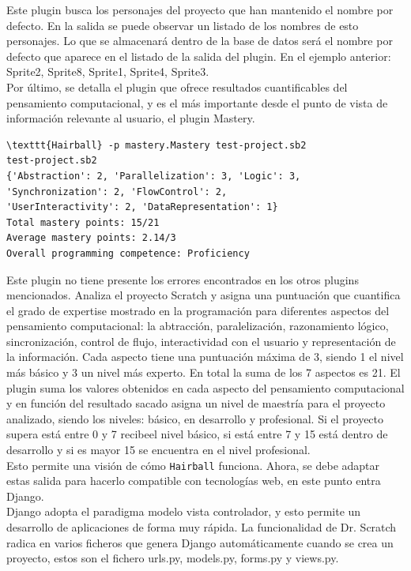 \documentclass[a4paper, 12pt]{book}
\begin{document}
Este plugin busca los personajes del proyecto que han mantenido el nombre por defecto. En
la salida se puede observar un listado de los nombres de esto personajes. Lo que se 
almacenará dentro de la base de datos será el nombre por defecto que aparece en el listado
de la salida del plugin. En el ejemplo anterior: Sprite2, Sprite8, Sprite1, Sprite4, Sprite3. \\


Por último, se detalla el plugin que ofrece resultados cuantificables del pensamiento 
computacional, y es el más importante desde el punto de vista de información relevante
al usuario, el plugin Mastery.

\begingroup
\fontsize{7pt}{8pt}\selectfont
\begin{verbatim}
\texttt{Hairball} -p mastery.Mastery test-project.sb2 
test-project.sb2
{'Abstraction': 2, 'Parallelization': 3, 'Logic': 3, 'Synchronization': 2, 'FlowControl': 2,
'UserInteractivity': 2, 'DataRepresentation': 1}
Total mastery points: 15/21
Average mastery points: 2.14/3
Overall programming competence: Proficiency
\end{verbatim}
\endgroup

Este plugin no tiene presente los errores encontrados en los otros plugins mencionados.
Analiza el proyecto Scratch y asigna una puntuación que cuantifica el grado de expertise
mostrado en la programación para diferentes aspectos del pensamiento computacional: la
abtracción, paralelización, razonamiento lógico, sincronización, control de flujo,
interactividad con el usuario y representación de la información. Cada aspecto tiene
una puntuación máxima de 3, siendo 1 el nivel más básico y 3 un nivel más experto. En
total la suma de los 7 aspectos es 21. El plugin suma los valores obtenidos en cada 
aspecto del pensamiento computacional y en función del resultado sacado asigna un
nivel de maestría para el proyecto analizado, siendo los niveles: básico, en desarrollo
y profesional. Si el proyecto supera está entre 0 y 7 recibeel nivel básico, si está 
entre 7 y 15 está dentro de desarrollo y si es mayor 15 se encuentra en el nivel
profesional. \\

Esto permite una visión de cómo \texttt{Hairball} funciona. Ahora, se debe adaptar estas
salida para hacerlo compatible con tecnologías web, en este punto entra Django.  \\

Django adopta el paradigma modelo vista controlador, y esto permite un desarrollo de 
aplicaciones de forma muy rápida. La funcionalidad de Dr. Scratch radica en varios 
ficheros que genera Django automáticamente cuando se crea un proyecto, estos son el
fichero urls.py, models.py, forms.py y views.py. \\
\end{document}
